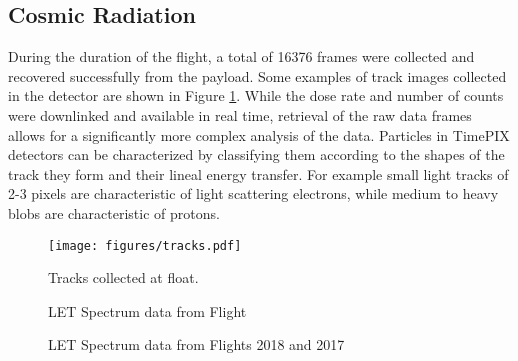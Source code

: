 \subsection{Cosmic Radiation}
\label{sec:Cosmic-Radiation-Results}

During the duration of the flight, a total of 16376 frames were collected and recovered successfully from the payload. Some examples of track images collected in the detector are shown in Figure \ref{tracks}. While the dose rate and number of counts were downlinked and available in real time, retrieval of the raw data frames allows for a significantly more complex analysis of the data. Particles in TimePIX detectors can be characterized by classifying them according to the shapes of the track they form and their lineal energy transfer. %
For example small light tracks of 2-3 pixels are characteristic of light scattering electrons, while medium to heavy blobs are characteristic of protons.

\begin{figure}[H]
	\begin{center}
	\texttt{[image: figures/tracks.pdf]}
	\caption{Tracks collected at float.}
	\label{tracks}
	\end{center}
\end{figure}

\begin{figure}[H]
\hfill
{}
\hfill
{}
\hfill
\caption{LET Spectrum data from Flight}
\end{figure}

\begin{figure}[H]
\hfill
{}
\hfill
{}
\hfill
\caption{LET Spectrum data from Flights 2018 and 2017}
\end{figure}

